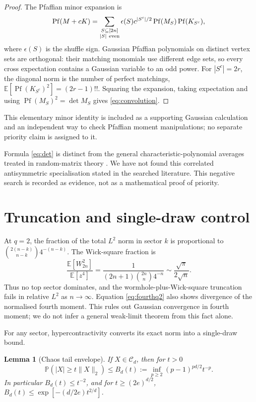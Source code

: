 \documentclass[11pt,a4paper]{article}
\newtheorem{lemma}[theorem]{Lemma}
\theoremstyle{definition}
\theoremstyle{remark}
\newcommand{\E}{\mathbb{E}}
\newcommand{\Pp}{\mathbb{P}}
\newcommand{\Ccal}{\mathcal{C}}
\newcommand{\norm}[1]{\lVert#1\rVert}
\begin{document}
\begin{proof}
The Pfaffian minor expansion is
\[
 \operatorname{Pf}(M+cK)=
 \sum_{\substack{S\subseteq[2n]\\|S|\ {\rm even}}}
 \epsilon(S)c^{|S^c|/2}\operatorname{Pf}(M_S)\operatorname{Pf}(K_{S^c}),
\]
where $\epsilon(S)$ is the shuffle sign.
Gaussian Pfaffian polynomials on distinct vertex sets are orthogonal: their matching
monomials use different edge sets, so every cross expectation contains a Gaussian
variable to an odd power.
For $|S^c|=2r$, the diagonal norm is the number of perfect matchings,
$\E[\operatorname{Pf}(K_{S^c})^2]=(2r-1)!!$.
Squaring the expansion, taking expectation and using $\operatorname{Pf}(M_S)^2=\det M_S$
gives \eqref{eq:convolution}.
\end{proof}

This elementary minor identity is included as a supporting Gaussian calculation and
an independent way to check Pfaffian moment manipulations; no separate priority claim
is assigned to it.

Formula \eqref{eq:det} is distinct from the general characteristic-polynomial averages
treated in random-matrix theory \citep{deBruijn1955,MehtaNormand2001}.  We have not found
this correlated antisymmetric specialisation stated in the searched literature.  This
negative search is recorded as evidence, not as a mathematical proof of priority.

\section{Truncation and single-draw control}

At $q=2$, the fraction of the total $L^2$ norm in sector $k$ is proportional to
$\binom{2(n-k)}{n-k}4^{-(n-k)}$.  The Wick-square fraction is
\begin{equation}
 \frac{\E[W_{2n}^2]}{\E[z^4]}
 =\frac{1}{(2n+1)\binom{2n}{n}4^{-n}}
 \sim\frac{\sqrt{\pi}}{2\sqrt n}.
 \label{eq:topfrac}
\end{equation}
Thus no top sector dominates, and the wormhole-plus-Wick-square truncation fails in relative
$L^2$ as $n\to\infty$.  Equation \eqref{eq:fourthq2} also shows divergence of the
normalised fourth moment.  This rules out Gaussian convergence in fourth moment; we do not
infer a general weak-limit theorem from this fact alone.

For any sector, hypercontractivity converts its exact norm into a single-draw bound.

\begin{lemma}[Chaos tail envelope]\label{lem:tail}
If $X\in\Ccal_d$, then for $t>0$
\begin{equation}
 \Pp(|X|\ge t\norm{X}_2)
 \le B_d(t):=\inf_{p\ge2}(p-1)^{pd/2}t^{-p}.
 \label{eq:B}
\end{equation}
In particular $B_d(t)\le t^{-2}$, and for $t\ge(2e)^{d/2}$,
$B_d(t)\le\exp[-(d/2e)t^{2/d}]$.
\end{lemma}
\end{document}
